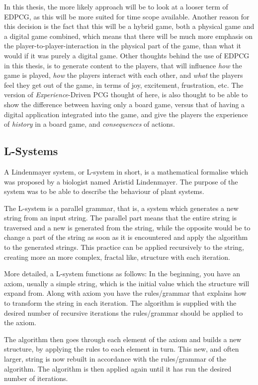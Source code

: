 In this thesis, the more likely approach will be to look at a looser term of EDPCG, as this will be more suited for time scope available.
Another reason for this decision is the fact that this will be a hybrid game, both a physical game and a digital game combined, which means that there will be much more emphasis on the player-to-player-interaction in the physical part of the game, than what it would if it was purely a digital game. Other thoughts behind the use of EDPCG in this thesis, is to generate content to the players, that will influence \textit{how} the game is played, \textit{how} the players interact with each other, and \textit{what} the players feel they get out of the game, in terms of joy, excitement, frustration, etc. 
The version of \textit{Experience}-Driven PCG thought of here, is also thought to be able to show the difference between having only a board game, versus that of having a digital application integrated into the game, and give the players the experience of \textit{history} in a board game, and \textit{consequences} of actions.

\subsection{L-Systems}
A Lindenmayer system, or L-system in short, is a mathematical formalise which was proposed by a biologist named Aristid Lindenmayer\cite{web:lsys}. The purpose of the system was to be able to describe the behaviour of plant systems.

The L-system is a parallel grammar, that is, a system which generates a new string from an input string. The parallel part means that the entire string is traversed and a new is generated from the string, while the opposite would be to change a part of the string as soon as it is encountered and apply the algorithm to the generated strings. 
This practice can be applied recursively to the string, creating more an more complex, fractal like, structure with each iteration. 

More detailed, a L-system functions as follows:
In the beginning, you have an axiom, usually a simple string, which is the initial value which the structure will expand from.
Along with axiom you have the rules/grammar that explains how to transform the string in each iteration. 
The algorithm is supplied with the desired number of recursive iterations the rules/grammar should be applied to the axiom.

The algorithm then goes through each element of the axiom and builds a new structure, by applying the rules to each element in turn. This new, and often larger, string is now rebuilt in accordance with the rules/grammar of the algorithm.
The algorithm is then applied again until it has run the desired number of iterations.

